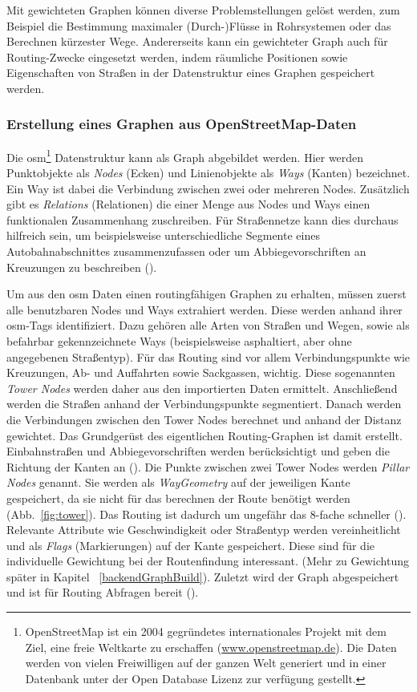 Mit gewichteten Graphen können diverse Problemstellungen gelöst werden, zum Beispiel die Bestimmung maximaler (Durch-)Flüsse in Rohrsystemen oder das Berechnen kürzester Wege.
Andererseits kann ein gewichteter Graph auch für Routing-Zwecke eingesetzt werden, indem räumliche Positionen sowie Eigenschaften von Straßen in der Datenstruktur eines Graphen gespeichert werden.

\subsubsection{Erstellung eines Graphen aus OpenStreetMap-Daten}
\label{sec:osmgraph}

Die \gls{osm}\footnote{OpenStreetMap ist ein 2004 gegründetes internationales Projekt mit dem Ziel, eine freie Weltkarte zu erschaffen (\href{www.openstreetmap.de}{www.openstreetmap.de}). Die Daten werden von vielen Freiwilligen auf der ganzen Welt generiert und in einer Datenbank unter der Open Database Lizenz zur verfügung gestellt.} Datenstruktur kann als Graph abgebildet werden.
Hier werden Punktobjekte als \textit{Nodes} (Ecken) und Linienobjekte als \textit{Ways} (Kanten) bezeichnet.
Ein Way ist dabei die Verbindung zwischen zwei oder mehreren Nodes.
Zusätzlich gibt es \textit{Relations} (Relationen) die einer Menge aus Nodes und Ways einen funktionalen Zusammenhang zuschreiben.
Für Straßennetze kann dies durchaus hilfreich sein, um beispielsweise unterschiedliche Segmente eines Autobahnabschnittes zusammenzufassen oder um Abbiegevorschriften an Kreuzungen zu beschreiben (\cite{osmrelation}).

Um aus den \gls{osm} Daten einen routingfähigen Graphen zu erhalten, müssen zuerst alle benutzbaren Nodes und Ways extrahiert werden.
Diese werden anhand ihrer \gls{osm}-Tags identifiziert.
Dazu gehören alle Arten von Straßen und Wegen, sowie als befahrbar gekennzeichnete Ways (beispielsweise asphaltiert, aber ohne angegebenen Straßentyp).
Für das Routing sind vor allem Verbindungspunkte wie Kreuzungen, Ab- und Auffahrten sowie Sackgassen, wichtig.
Diese sogenannten \textit{Tower Nodes} werden daher aus den importierten Daten ermittelt.
Anschließend werden die Straßen anhand der Verbindungspunkte segmentiert.
Danach werden die Verbindungen zwischen den Tower Nodes berechnet und anhand der Distanz gewichtet.
Das Grundgerüst des eigentlichen Routing-Graphen ist damit erstellt.
Einbahnstraßen und Abbiegevorschriften werden berücksichtigt und geben die Richtung der Kanten an (\cite{osmgraph}).
Die Punkte zwischen zwei Tower Nodes werden \textit{Pillar Nodes} genannt.
Sie werden als \textit{WayGeometry} auf der jeweiligen Kante gespeichert, da sie nicht für das berechnen der Route benötigt werden (Abb.~\ref{fig:tower}).
Das Routing ist dadurch um ungefähr das 8-fache schneller (\cite{graphhopper}).
Relevante Attribute wie Geschwindigkeit oder Straßentyp werden vereinheitlicht und als \textit{Flags} (Markierungen) auf der Kante gespeichert.
Diese sind für die individuelle Gewichtung bei der Routenfindung interessant.
(Mehr zu Gewichtung später in Kapitel ~\ref{backendGraphBuild}).
Zuletzt wird der Graph abgespeichert und ist für Routing Abfragen bereit (\cite{osmgraph}).

